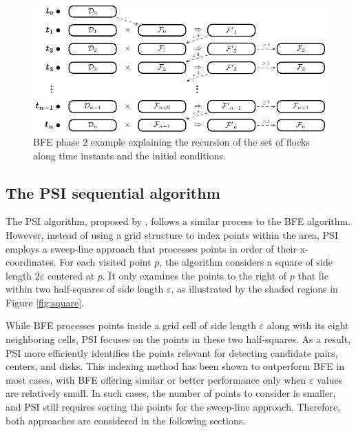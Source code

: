 \begin{figure}[!ht]
    \centering
    \includegraphics[width=\linewidth]{chapter4/figures/FF_stages}
    \caption{BFE phase 2 example explaining the recursion of the set of flocks along time instants and the initial conditions.}\label{fig:FF_stages}
\end{figure}

\subsection{The PSI sequential algorithm}
The PSI algorithm, proposed by \cite{tanaka_improved_2016}, follows a similar process to the BFE algorithm. However, instead of using a grid structure to index points within the area, PSI employs a sweep-line approach that processes points in order of their x-coordinates. For each visited point $p$, the algorithm considers a square of side length $2\varepsilon$ centered at $p$. It only examines the points to the right of $p$ that lie within two half-squares of side length $\varepsilon$, as illustrated by the shaded regions in Figure \ref{fig:square}. 

While BFE processes points inside a grid cell of side length $\varepsilon$ along with its eight neighboring cells, PSI focuses on the points in these two half-squares. As a result, PSI more efficiently identifies the points relevant for detecting candidate pairs, centers, and disks. This indexing method has been shown to outperform BFE in most cases, with BFE offering similar or better performance only when $\varepsilon$ values are relatively small. In such cases, the number of points to consider is smaller, and PSI still requires sorting the points for the sweep-line approach. Therefore, both approaches are considered in the following sections.

